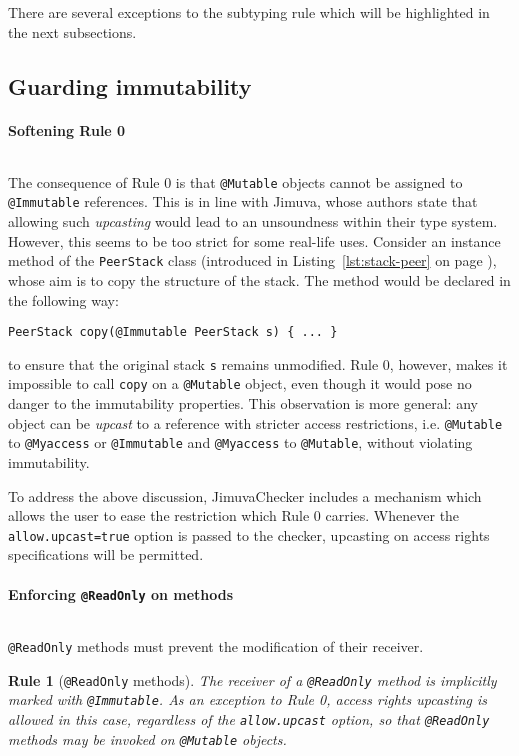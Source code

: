 \documentclass{pracamgr}
\theoremstyle{all}
\newtheorem{verrule}{Rule}
\newcommand{\crlf}[0]{$\ $ \newline}
\begin{document}
There are several exceptions to the subtyping rule which will be
highlighted in the next subsections. 

\subsection{Guarding immutability}

\paragraph{Softening Rule 0} \crlf

The consequence of Rule 0 is that \texttt{@Mutable} objects cannot be
assigned to \texttt{@Immutable} references. This is in line with
Jimuva, whose authors state that allowing such \emph{upcasting} would
lead to an unsoundness within their type system. However, this seems
to be too strict for some real-life uses. Consider an instance method
of the \texttt{PeerStack} class (introduced in
Listing~\ref{lst:stack-peer} on page \pageref{lst:stack-peer}), whose
aim is to copy the structure of the stack. The method would be
declared in the following way:
\begin{lstlisting}
PeerStack copy(@Immutable PeerStack s) { ... }
\end{lstlisting}
to ensure that the original stack \texttt{s} remains unmodified. Rule
0, however, makes it impossible to call \texttt{copy} on a
\texttt{@Mutable} object, even though it would pose no danger to the
immutability properties. This observation is more general: any object
can be \emph{upcast} to a reference with stricter access restrictions,
i.e. \texttt{@Mutable} to \texttt{@Myaccess} or \texttt{@Immutable}
and \texttt{@Myaccess} to \texttt{@Mutable}, without violating
immutability.

To address the above discussion, JimuvaChecker includes a mechanism
which allows the user to ease the restriction which Rule 0
carries. Whenever the \texttt{allow.upcast=true} option is passed to
the checker, upcasting on access rights specifications will be
permitted.

\paragraph{Enforcing \texttt{@ReadOnly} on methods} \crlf

\texttt{@ReadOnly} methods must prevent the modification of their
receiver. 

\begin{verrule}[\texttt{@ReadOnly} methods]
  The receiver of a \texttt{@ReadOnly} method is implicitly marked
  with \texttt{@Immutable}. As an exception to Rule 0, access rights
  upcasting is allowed in this case, regardless of the
  \texttt{allow.upcast} option, so that \texttt{@ReadOnly} methods may
  be invoked on \texttt{@Mutable} objects.
\end{verrule}
\end{document}
